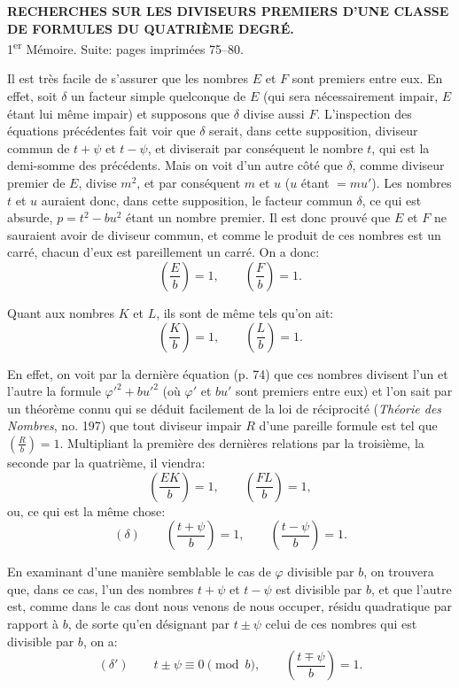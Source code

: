 \documentclass[11pt]{article}
\newcommand{\leg}[2]{\left(\frac{#1}{#2}\right)}
\newcommand{\unitid}[1]{\hypertarget{#1}{}}
\begin{document}
\begin{center}
{\Large\bfseries RECHERCHES SUR LES DIVISEURS PREMIERS D'UNE CLASSE\\
DE FORMULES DU QUATRIÈME DEGRÉ.}\\[1.2em]
{1\textsuperscript{er} Mémoire. Suite: pages imprimées 75--80.}
\end{center}

\unitid{dirichlet.v1.p04b.par.001}Il est très facile de s'assurer que les nombres $E$ et $F$ sont premiers entre eux. En effet, soit $\delta$ un facteur simple quelconque de $E$ (qui sera nécessairement impair, $E$ étant lui même impair) et supposons que $\delta$ divise aussi $F$. L'inspection des équations précédentes fait voir que $\delta$ serait, dans cette supposition, diviseur commun de $t+\psi$ et $t-\psi$, et diviserait par conséquent le nombre $t$, qui est la demi-somme des précédents. Mais on voit d'un autre côté que $\delta$, comme diviseur premier de $E$, divise $m^2$, et par conséquent $m$ et $u$ ($u$ étant $=mu'$). Les nombres $t$ et $u$ auraient donc, dans cette supposition, le facteur commun $\delta$, ce qui est absurde, $p=t^2-bu^2$ étant un nombre premier. Il est donc prouvé que $E$ et $F$ ne sauraient avoir de diviseur commun, et comme le produit de ces nombres est un carré, chacun d'eux est pareillement un carré. On a donc:
\unitid{dirichlet.v1.p04b.eq.001}
\[
\leg{E}{b}=1,\qquad \leg{F}{b}=1.
\]

\unitid{dirichlet.v1.p04b.par.002}Quant aux nombres $K$ et $L$, ils sont de même tels qu'on ait:
\unitid{dirichlet.v1.p04b.eq.002}
\[
\leg{K}{b}=1,\qquad \leg{L}{b}=1.
\]

\unitid{dirichlet.v1.p04b.par.003}En effet, on voit par la dernière équation (p. 74) que ces nombres divisent l'un et l'autre la formule $\varphi'^2+bu'^2$ (où $\varphi'$ et $bu'$ sont premiers entre eux) et l'on sait par un théorème connu qui se déduit facilement de la loi de réciprocité (\emph{Théorie des Nombres}, no. 197) que tout diviseur impair $R$ d'une pareille formule est tel que $\leg{R}{b}=1$. Multipliant la première des dernières relations par la troisième, la seconde par la quatrième, il viendra:
\unitid{dirichlet.v1.p04b.eq.003}
\[
\leg{EK}{b}=1,\qquad \leg{FL}{b}=1,
\]
ou, ce qui est la même chose:
\unitid{dirichlet.v1.p04b.eq.004}
\[
(\delta)\qquad \leg{t+\psi}{b}=1,\qquad \leg{t-\psi}{b}=1.
\]

\unitid{dirichlet.v1.p04b.par.004}En examinant d'une manière semblable le cas de $\varphi$ divisible par $b$, on trouvera que, dans ce cas, l'un des nombres $t+\psi$ et $t-\psi$ est divisible par $b$, et que l'autre est, comme dans le cas dont nous venons de nous occuper, résidu quadratique par rapport à $b$, de sorte qu'en désignant par $t\pm\psi$ celui de ces nombres qui est divisible par $b$, on a:
\unitid{dirichlet.v1.p04b.eq.005}
\[
(\delta')\qquad t\pm\psi\equiv0\pmod b,\qquad
\leg{t\mp\psi}{b}=1.
\]
\end{document}
